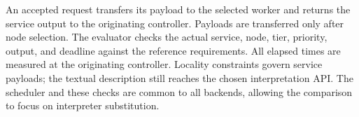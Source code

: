 An accepted request transfers its payload to the selected worker and returns
the service output to the originating controller. Payloads are transferred
only after node selection. The evaluator checks the actual service, node,
tier, priority, output, and deadline against the reference requirements.
All elapsed times are measured at the originating controller. Locality
constraints govern service payloads; the textual description still reaches
the chosen interpretation API. The scheduler and these checks are common
to all backends, allowing the comparison to focus on interpreter substitution.
